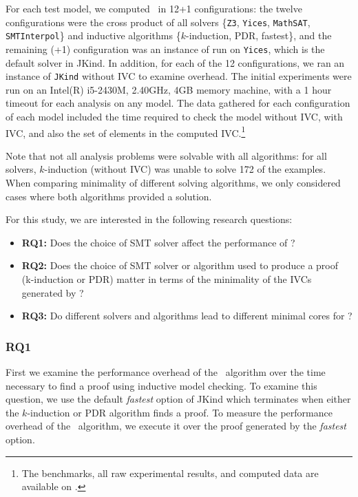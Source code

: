 For each test model, we computed \ucalg\ in 12+1 configurations: the
twelve configurations were the cross product of all solvers \{\texttt{Z3},
\texttt{Yices}, \texttt{MathSAT}, \texttt{SMTInterpol}\} and inductive algorithms
\{$k$-induction, PDR, fastest\}, and the remaining (+1) configuration
was an instance of \bfalg run on \texttt{Yices}, which is the default solver in
JKind.
 In addition, for each of the 12 configurations, we ran an
instance of \texttt{JKind} without IVC to examine overhead. The initial experiments
were run on an Intel(R) i5-2430M, 2.40GHz, 4GB memory machine, with a
1 hour timeout for each analysis on any model. The data gathered for
each configuration of each model included the time required to check
the model without IVC, with IVC, and also the set of elements in the
computed IVC.\footnote{The benchmarks, all raw experimental results,
  and computed data are available on \cite{expr}.}

Note that not all analysis problems were solvable with all algorithms: for all solvers, $k$-induction (without IVC) was unable to solve 172 of the examples.  When comparing minimality of different solving algorithms, we only considered cases where both algorithms provided a solution.

For this study, we are interested in the following research questions:
\begin{itemize}
  \item \textbf{RQ1:} Does the choice of SMT solver affect the performance of \ucalg ?
  \item \textbf{RQ2:} Does the choice of SMT solver or algorithm used to produce a proof
(k-induction or PDR) matter in terms of the minimality of the IVCs generated by \ucalg ?
  \item \textbf{RQ3:} Do different solvers and algorithms
lead to different minimal cores for \ucalg ?
\end{itemize}

\vspace{0.1in}
\subsubsection{RQ1}
First we examine the performance overhead of the \ucalg\ algorithm over the time necessary to find a proof using inductive model checking.  To examine this question, we use the default {\em fastest} option of JKind which terminates when either the $k$-induction or PDR algorithm finds a proof.  To measure the performance overhead of the \ucalg\ algorithm, we execute it over the proof generated by the {\em fastest} option.

